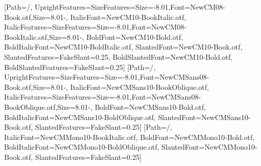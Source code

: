 %
\usepackage{fontspec}
\setmainfont{NewCM10-Book.otf}[Path=\LeanTeXNcm/,
  UprightFeatures={SizeFeatures={{Size=-8.01,Font=NewCM08-Book.otf},{Size=8.01-}}},
  ItalicFont=NewCM10-BookItalic.otf,
  ItalicFeatures={SizeFeatures={{Size=-8.01,Font=NewCM08-BookItalic.otf},{Size=8.01-}}},
  BoldFont=NewCM10-Bold.otf, BoldItalicFont=NewCM10-BoldItalic.otf,
  SlantedFont=NewCM10-Book.otf, SlantedFeatures={FakeSlant=0.25},
  BoldSlantedFont=NewCM10-Bold.otf, BoldSlantedFeatures={FakeSlant=0.25}]
\setsansfont{NewCMSans10-Book.otf}[Path=\LeanTeXNcm/,
  UprightFeatures={SizeFeatures={{Size=-8.01,Font=NewCMSans08-Book.otf},{Size=8.01-}}},
  ItalicFont=NewCMSans10-BookOblique.otf,
  ItalicFeatures={SizeFeatures={{Size=-8.01,Font=NewCMSans08-BookOblique.otf},{Size=8.01-}}},
  BoldFont=NewCMSans10-Bold.otf, BoldItalicFont=NewCMSans10-BoldOblique.otf,
  SlantedFont=NewCMSans10-Book.otf, SlantedFeatures={FakeSlant=0.25}]
\setmonofont{NewCMMono10-Book.otf}[Path=\LeanTeXNcm/,
  ItalicFont=NewCMMono10-BookItalic.otf, BoldFont=NewCMMono10-Bold.otf,
  BoldItalicFont=NewCMMono10-BoldOblique.otf,
  SlantedFont=NewCMMono10-Book.otf, SlantedFeatures={FakeSlant=0.25}]
